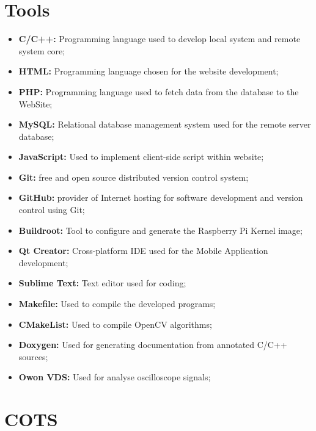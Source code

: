 \clearpage
\section{Tools}

\begin{itemize}
	\item \textbf{C/C++:} Programming language used to develop local system and remote system core;
	\item \textbf{HTML:} Programming language chosen for the website development;
	\item \textbf{PHP:} Programming language used to fetch data from the database to the WebSite;
	\item \textbf{MySQL:} Relational database management system used for the remote server database;
	\item \textbf{JavaScript:} Used to implement client-side script within website;
	\item \textbf{Git:} free and open source distributed version control system;
	\item \textbf{GitHub:} provider of Internet hosting for software development and version control using Git;
	\item \textbf{Buildroot:} Tool to configure and generate the Raspberry Pi Kernel image;
	
	\item \textbf{Qt Creator:} Cross-platform IDE used for the Mobile Application development;
	\item \textbf{Sublime Text:} Text editor used for coding;
			
	\item \textbf{Makefile:} Used to compile the developed programs;
	\item \textbf{CMakeList:} Used to compile OpenCV algorithms;

	\item \textbf{Doxygen:} Used for generating documentation from annotated C/C++ sources;
	\item \textbf{Owon VDS:} Used for analyse oscilloscope signals;
\end{itemize}

\section{COTS}

